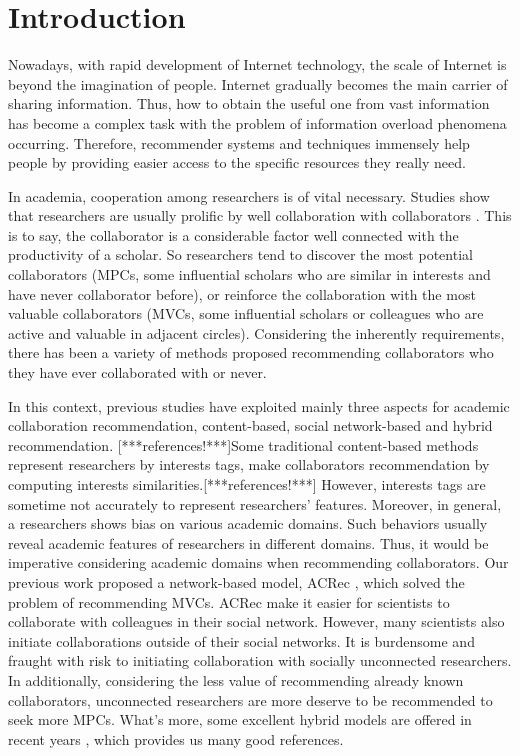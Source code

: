 \documentclass[review]{elsarticle}
\begin{document}
\section{Introduction}
Nowadays, with rapid development of Internet technology, the scale of Internet is beyond the imagination of people. Internet gradually becomes the main carrier of sharing information. Thus, how to obtain the useful one from vast information has become a complex task with the problem of information overload phenomena occurring. Therefore, recommender systems and techniques immensely help people by providing easier access to the specific resources they really need.

In academia, cooperation among researchers is of vital necessary. Studies show that researchers are usually prolific by well collaboration with collaborators \cite{lee2005impact}. This is to say, the collaborator is a considerable factor well connected with the productivity of a scholar. So researchers tend to discover the most potential collaborators (MPCs, some influential scholars who are similar in interests and have never collaborator before), or reinforce the collaboration with the most valuable collaborators (MVCs, some influential scholars or colleagues who are active and valuable in adjacent circles). Considering the inherently requirements, there has been a variety of methods proposed recommending collaborators who they have ever collaborated with or never.

In this context, previous studies have exploited mainly three aspects for academic collaboration recommendation, content-based, social network-based and hybrid recommendation. [***references!***]Some traditional content-based methods represent researchers by interests tags, make collaborators recommendation by computing interests similarities.[***references!***] However, interests tags are sometime not accurately to represent researchers' features. Moreover, in general, a researchers shows bias on various academic domains. Such behaviors usually reveal academic features of researchers in different domains. Thus, it would be imperative considering academic domains when recommending collaborators. Our previous work proposed a network-based model, ACRec \cite{li2014acrec}, which solved the problem of recommending MVCs. ACRec make it easier for scientists to collaborate with colleagues in their social network. However, many scientists also initiate collaborations outside of their social networks. It is burdensome and fraught with risk to initiating collaboration with socially unconnected researchers. In additionally, considering the less value of recommending already known collaborators, unconnected researchers are more deserve to be recommended to seek more MPCs. What's more, some excellent hybrid models are offered in recent years \cite{lee2011recommending}, which provides us many good references.
\end{document}
